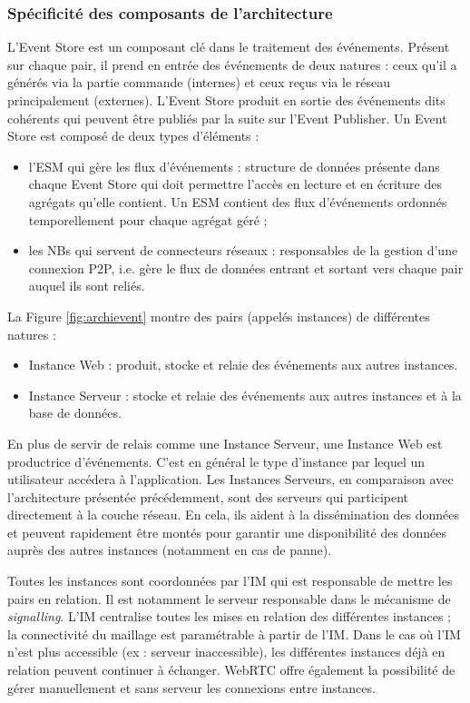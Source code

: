 \subsubsection{Spécificité des composants de l'architecture}
L'Event Store est un composant clé dans le traitement des événements. Présent 
sur chaque pair, il prend en entrée des événements de deux natures : ceux qu'il a 
générés via la partie commande (internes) et ceux reçus via le réseau 
principalement (externes). 
L'Event Store produit en sortie des événements dits \og 
cohérents\fg{} qui peuvent être publiés par la suite sur l'Event Publisher.
Un Event Store est composé de deux types d'éléments : 
\begin{itemize}
	\item l'\gls{ESM} qui gère les flux d'événements : structure de données 
	présente dans chaque Event Store qui doit permettre l'accès en lecture et en 
	écriture des agrégats qu'elle contient. 
	Un \gls{ESM} contient des flux d'événements ordonnés temporellement 
	pour chaque agrégat géré ;
	\item les \glspl{NB} qui servent de connecteurs réseaux : responsables de la 
	gestion d'une connexion \gls{P2P}, i.e. gère le flux de données entrant et 
	sortant vers chaque pair auquel ils sont reliés.
\end{itemize}

La Figure \ref{fig:archievent} montre des pairs (appelés instances) de différentes 
natures :
\begin{itemize}
	\item Instance Web :  produit, stocke et relaie des événements aux autres 
	instances.
	\item Instance Serveur : stocke et relaie des événements aux autres instances 
	et à la base de données. 
\end{itemize}

En plus de servir de relais comme une Instance Serveur, une Instance Web est 
productrice d'événements. C'est en général le type d'instance par lequel un 
utilisateur accédera à l'application. Les Instances Serveurs, en comparaison avec 
l'architecture présentée précédemment, sont des \og serveurs\fg{} qui participent 
directement à la couche réseau. En cela, ils aident à la dissémination des données 
et peuvent rapidement être montés pour garantir une disponibilité des données 
auprès des autres instances (notamment en cas de panne).

Toutes les instances sont coordonnées par l'\gls{IM} qui est responsable de mettre 
les pairs en relation. Il est notamment le serveur responsable dans le mécanisme 
de \textit{signalling}. L'\gls{IM} centralise toutes les mises en relation des 
différentes instances ; la connectivité du maillage est paramétrable à partir de 
l'\gls{IM}. Dans le cas où l'\gls{IM} n'est plus accessible (ex : serveur 
inaccessible), les différentes instances déjà en relation peuvent continuer à 
échanger. \gls{WebRTC} offre également la possibilité de gérer manuellement et 
sans serveur les connexions entre instances. 


